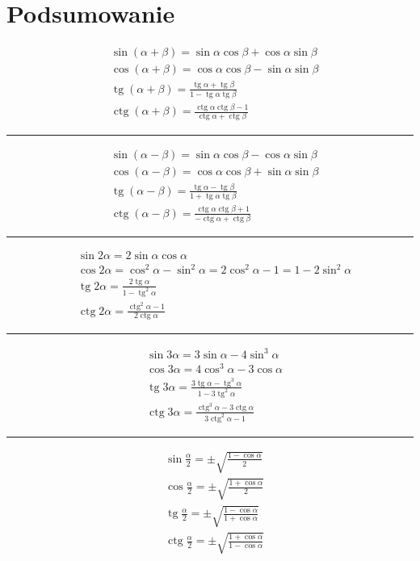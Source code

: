 \documentclass[12pt,a4paper,fleqn]{article}
\DeclareMathOperator{\tg}{tg}
\DeclareMathOperator{\ctg}{ctg}
\begin{document}
\newpage
\section{Podsumowanie}
	\begin{align*}
		&\sin (\alpha +\beta) = \sin\alpha\cos\beta + \cos\alpha\sin\beta\\
		&\cos (\alpha + \beta) = \cos\alpha\cos\beta - \sin\alpha\sin\beta\\
		&\tg (\alpha + \beta) = \frac{\tg \alpha + \tg \beta}{1 - \tg \alpha \tg \beta}\\
		&\ctg (\alpha + \beta) = \frac{\ctg\alpha\ctg\beta-1}{\ctg\alpha+\ctg\beta}
	\end{align*}
	
	
	\noindent\rule{10cm}{0.4pt}
	\begin{align*}
		&\sin(\alpha-\beta) = \sin\alpha\cos\beta-\cos\alpha\sin\beta\\
		&\cos(\alpha-\beta) = \cos\alpha\cos\beta + \sin\alpha\sin\beta\\
		&\tg(\alpha-\beta)= \frac{\tg \alpha - \tg \beta}{1 + \tg \alpha \tg \beta}\\
		&\ctg (\alpha - \beta) = \frac{\ctg\alpha\ctg\beta+1}{-\ctg\alpha+\ctg\beta}
	\end{align*}
	
	\noindent\rule{10cm}{0.4pt}
	\begin{align*}
		&\sin2\alpha = 2\sin\alpha\cos\alpha\\
		&\cos2\alpha = \cos^2\alpha-\sin^2\alpha = 2\cos^2\alpha - 1 = 1-2\sin^2\alpha\\
		&\tg2\alpha = \frac{2\tg \alpha}{1 - \tg^2 \alpha}\\
		&\ctg2\alpha = \frac{\ctg^2\alpha-1}{2\ctg\alpha}
	\end{align*}
		
	\noindent\rule{10cm}{0.4pt}
	\begin{align*}
		&\sin3\alpha = 3\sin\alpha -4\sin^3\alpha\\
		&\cos3\alpha = 4\cos^3\alpha -3\cos\alpha\\
		&\tg3\alpha = \frac{3\tg\alpha-\tg^3\alpha}{1-3\tg^2\alpha}\\
		&\ctg3\alpha = \frac{\ctg^3\alpha - 3\ctg\alpha}{3\ctg^2\alpha-1}
	\end{align*}
	
	\noindent\rule{10cm}{0.4pt}
	\begin{align*}
		&\sin\frac{\alpha}{2} = \pm \sqrt{\frac{1-\cos\alpha}{2}}\\
		&\cos\frac{\alpha}{2} = \pm \sqrt{\frac{1+\cos\alpha}{2}}\\
		&\tg\frac{\alpha}{2} = \pm \sqrt{\frac{1-\cos\alpha}{1+\cos\alpha}}\\
		&\ctg\frac{\alpha}{2} = \pm \sqrt{\frac{1+\cos\alpha}{1-\cos\alpha}}
	\end{align*}
	
	
\end{document}
